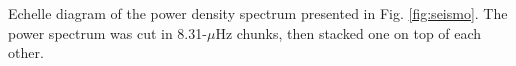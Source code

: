 \label{fig:echelle}  Echelle diagram of the power density spectrum presented in Fig. \ref{fig:seismo}. The power spectrum was cut in 8.31-$\mu$Hz chunks, then stacked one on top of each other.   
  
  
  